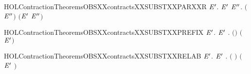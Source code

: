 \newcommand{\HOLContractionTheoremsOBSXXcontractsXXSUBSTXXPARXXL}{\UseVerbatim{HOLContractionTheoremsOBSXXcontractsXXSUBSTXXPARXXL}}
\begin{SaveVerbatim}{HOLContractionTheoremsOBSXXcontractsXXSUBSTXXPARXXR}
\HOLTokenTurnstile{} \HOLSymConst{\HOLTokenForall{}} \ensuremath{\HOLBoundVar{E}\sp{\prime}}.
         \ensuremath{\HOLBoundVar{E}\sp{\prime}} \HOLSymConst{\HOLTokenImp{}}
       \HOLSymConst{\HOLTokenForall{}}\ensuremath{\HOLBoundVar{E}\sp{\prime\prime}}.  \ensuremath{(} \HOLSymConst{\ensuremath{\mid}} \ensuremath{\HOLBoundVar{E}\sp{\prime\prime}}\ensuremath{)} \ensuremath{(}\ensuremath{\HOLBoundVar{E}\sp{\prime}} \HOLSymConst{\ensuremath{\mid}} \ensuremath{\HOLBoundVar{E}\sp{\prime\prime}}\ensuremath{)}
\end{SaveVerbatim}
\newcommand{\HOLContractionTheoremsOBSXXcontractsXXSUBSTXXPARXXR}{\UseVerbatim{HOLContractionTheoremsOBSXXcontractsXXSUBSTXXPARXXR}}
\begin{SaveVerbatim}{HOLContractionTheoremsOBSXXcontractsXXSUBSTXXPREFIX}
\HOLTokenTurnstile{} \HOLSymConst{\HOLTokenForall{}} \ensuremath{\HOLBoundVar{E}\sp{\prime}}.   \ensuremath{\HOLBoundVar{E}\sp{\prime}} \HOLSymConst{\HOLTokenImp{}} \HOLSymConst{\HOLTokenForall{}}.  \ensuremath{(}\HOLSymConst{\ensuremath{\ldotp}}\ensuremath{)} \ensuremath{(}\HOLSymConst{\ensuremath{\ldotp}}\ensuremath{\HOLBoundVar{E}\sp{\prime}}\ensuremath{)}
\end{SaveVerbatim}
\newcommand{\HOLContractionTheoremsOBSXXcontractsXXSUBSTXXPREFIX}{\UseVerbatim{HOLContractionTheoremsOBSXXcontractsXXSUBSTXXPREFIX}}
\begin{SaveVerbatim}{HOLContractionTheoremsOBSXXcontractsXXSUBSTXXRELAB}
\HOLTokenTurnstile{} \HOLSymConst{\HOLTokenForall{}} \ensuremath{\HOLBoundVar{E}\sp{\prime}}.
         \ensuremath{\HOLBoundVar{E}\sp{\prime}} \HOLSymConst{\HOLTokenImp{}}
       \HOLSymConst{\HOLTokenForall{}}.  \ensuremath{(}  \ensuremath{)} \ensuremath{(} \ensuremath{\HOLBoundVar{E}\sp{\prime}} \ensuremath{)}
\end{SaveVerbatim}
\newcommand{\HOLContractionTheoremsOBSXXcontractsXXSUBSTXXRELAB}{\UseVerbatim{HOLContractionTheoremsOBSXXcontractsXXSUBSTXXRELAB}}
